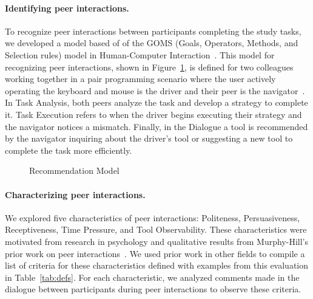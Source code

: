 \paragraph{Identifying peer interactions.}

To recognize peer interactions between participants completing the study tasks, we developed a model based of of the GOMS (Goals, Operators, Methods, and Selection rules) model in Human-Computer Interaction~\cite{diaper2003handbook}. This model for recognizing peer interactions, shown in Figure~\ref{fig:rec-model}, is defined for two colleagues working together in a pair programming scenario where the user actively operating the keyboard and mouse is the driver and their peer is the navigator~\cite{WilliamsPairProgramming}. In Task Analysis, both peers analyze the task and develop a strategy to complete it. Task Execution refers to when the driver begins executing their strategy and the navigator notices a mismatch. Finally, in the Dialogue a tool is recommended by the navigator inquiring about the driver's tool or suggesting a new tool to complete the task more efficiently.

\noindent
\begin{figure}
\centering
{}
\caption{Recommendation Model}
\label{fig:rec-model}
\end{figure}

\paragraph{Characterizing peer interactions.} We explored five characteristics of peer interactions: Politeness, Persuasiveness, Receptiveness, Time Pressure, and Tool Observability. These characteristics were motivated from research in psychology and qualitative results from Murphy-Hill's prior work on peer interactions~\cite{Murphy-Hill2015HowDoUsers}. We used prior work in other fields to compile a list of criteria for these characteristics defined with examples from this evaluation in Table~\ref{tab:defs}. For each characteristic, we analyzed comments made in the dialogue between participants during peer interactions to observe these criteria. 

